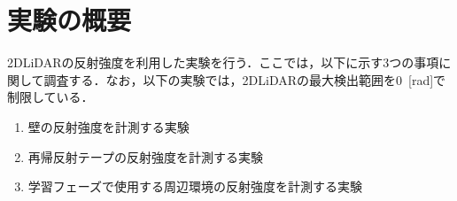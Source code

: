 
\section{実験の概要}

  2DLiDARの反射強度を利用した実験を行う．ここでは，以下に示す3つの事項に関して調査する．なお，以下の実験では，2DLiDARの最大検出範囲を0 \,[rad]で制限している．

\vspace{1cm}

  \begin{enumerate}
    \item 壁の反射強度を計測する実験
    \item 再帰反射テープの反射強度を計測する実験
    \item 学習フェーズで使用する周辺環境の反射強度を計測する実験
  \end{enumerate}

\newpage